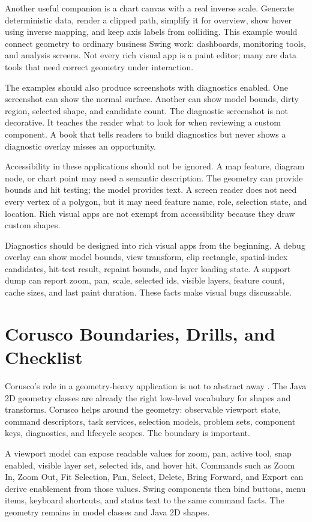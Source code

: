 Another useful companion is a chart canvas with a real inverse scale. Generate deterministic data, render a clipped path, simplify it for overview, show hover using inverse mapping, and keep axis labels from colliding. This example would connect geometry to ordinary business Swing work: dashboards, monitoring tools, and analysis screens. Not every rich visual app is a paint editor; many are data tools that need correct geometry under interaction.

The examples should also produce screenshots with diagnostics enabled. One screenshot can show the normal surface. Another can show model bounds, dirty region, selected shape, and candidate count. The diagnostic screenshot is not decorative. It teaches the reader what to look for when reviewing a custom component. A book that tells readers to build diagnostics but never shows a diagnostic overlay misses an opportunity.

Accessibility in these applications should not be ignored. A map feature, diagram node, or chart point may need a semantic description. The geometry can provide bounds and hit testing; the model provides text. A screen reader does not need every vertex of a polygon, but it may need feature name, role, selection state, and location. Rich visual apps are not exempt from accessibility because they draw custom shapes.

Diagnostics should be designed into rich visual apps from the beginning. A debug overlay can show model bounds, view transform, clip rectangle, spatial-index candidates, hit-test result, repaint bounds, and layer loading state. A support dump can report zoom, pan, scale, selected ids, visible layers, feature count, cache sizes, and last paint duration. These facts make visual bugs discussable.

\section{Corusco Boundaries, Drills, and Checklist}

Corusco's role in a geometry-heavy application is not to abstract away . The Java 2D geometry classes are already the right low-level vocabulary for shapes and transforms. Corusco helps around the geometry: observable viewport state, command descriptors, task services, selection models, problem sets, component keys, diagnostics, and lifecycle scopes. The boundary is important.

A viewport model can expose readable values for zoom, pan, active tool, snap enabled, visible layer set, selected ids, and hover hit. Commands such as Zoom In, Zoom Out, Fit Selection, Pan, Select, Delete, Bring Forward, and Export can derive enablement from those values. Swing components then bind buttons, menu items, keyboard shortcuts, and status text to the same command facts. The geometry remains in model classes and Java 2D shapes.


